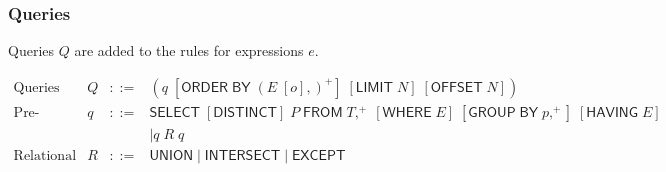 \documentclass{article}
\newcommand{\mt}[1]{\mathsf{#1}}
\begin{document}
\subsubsection{Queries}

Queries $Q$ are added to the rules for expressions $e$.

$$\begin{array}{rrcll}
  \textrm{Queries} & Q &::=& (q \; [\mt{ORDER} \; \mt{BY} \; (E \; [o],)^+] \; [\mt{LIMIT} \; N] \; [\mt{OFFSET} \; N]) \\
  \textrm{Pre-queries} & q &::=& \mt{SELECT} \; [\mt{DISTINCT}] \; P \; \mt{FROM} \; T,^+ \; [\mt{WHERE} \; E] \; [\mt{GROUP} \; \mt{BY} \; p,^+] \; [\mt{HAVING} \; E] \\
  &&& \mid q \; R \; q \\
  \textrm{Relational operators} & R &::=& \mt{UNION} \mid \mt{INTERSECT} \mid \mt{EXCEPT}
\end{array}$$
\end{document}

